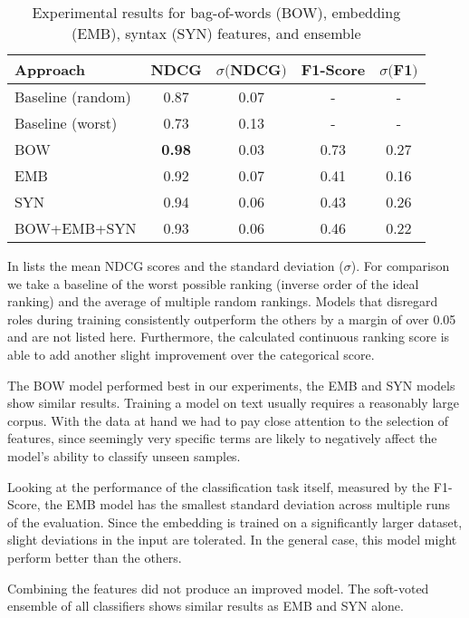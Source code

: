 \begin{table}
	\caption{Experimental results for bag-of-words (BOW), embedding (EMB), syntax (SYN) features, and ensemble}
	\label{tab:results}
	\begin{tabular}{lcccc}
		\toprule
		Approach & NDCG & $\sigma ($NDCG$)$ & F1-Score &  $\sigma ($F1$)$\\
		\midrule
		Baseline (random) & 0.87 & 0.07 & - & - \\
		Baseline (worst)  & 0.73 & 0.13 & - & - \\
		\midrule
		BOW & \textbf{0.98} & 0.03 & 0.73 & 0.27\\
		EMB & 0.92 & 0.07 & 0.41 & 0.16\\
		SYN & 0.94 & 0.06 & 0.43 & 0.26 \\
		BOW+EMB+SYN& 0.93 & 0.06 & 0.46 & 0.22\\
		\bottomrule
	\end{tabular}
\end{table}

In  lists the mean NDCG scores and the standard deviation ($\sigma$).
For comparison we take a baseline of the worst possible ranking (inverse order of the ideal ranking) and the average of multiple random rankings.
Models that disregard roles during training consistently outperform the others by a margin of over 0.05 and are not listed here.
Furthermore, the calculated continuous ranking score is able to add another slight improvement over the categorical score.

The BOW model performed best in our experiments, the EMB and SYN models show similar results. 
Training a model on text usually requires a reasonably large corpus.
With the data at hand we had to pay close attention to the selection of features, since seemingly very specific terms are likely to negatively affect the model's ability to classify unseen samples.

Looking at the performance of the classification task itself, measured by the F1-Score, the EMB model has the smallest standard deviation across multiple runs of the evaluation.
Since the embedding is trained on a significantly larger dataset, slight deviations in the input are tolerated.
In the general case, this model might perform better than the others.

Combining the features did not produce an improved model. The soft-voted ensemble of all classifiers shows similar results as EMB and SYN alone.


%



